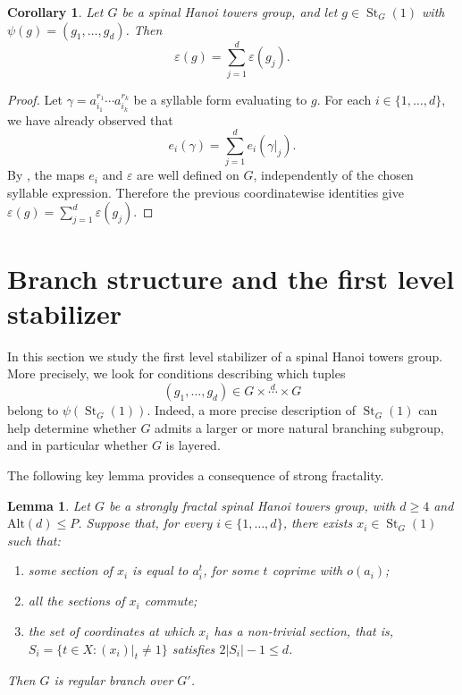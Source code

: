 \documentclass[11pt,leqno]{amsart}
\theoremstyle{plain}
\newtheorem{corollary}[corollary]{Corollary}
\newtheorem{lemma}[lemma]{Lemma}
\DeclareMathOperator{\St}{St}
\newcommand{\alt}{\mathrm{Alt}}
\newcommand{\fc}[1]{\textcolor{teal}{#1}}
\numberwithin{equation}{section}
\begin{document}
\begin{corollary}\label{cor:epsilon-sections}
Let $G$ be a spinal Hanoi towers group, and let $g\in \St_G(1)$ with $\psi(g)=(g_1,\ldots,g_d)$.
Then
\[
\varepsilon(g)=\sum_{j=1}^d \varepsilon(g_j).
\]
\end{corollary}

\begin{proof}
Let $\gamma=a_{i_1}^{r_1}\cdots a_{i_k}^{r_k}$ be a syllable form evaluating to $g$. For each $i\in\{1,\ldots,d\}$, we have
already observed that
\[
e_i(\gamma)=\sum_{j=1}^d e_i(\gamma|_j).
\]
By , the maps $e_i$ and $\varepsilon$ are well defined on $G$, independently of the chosen syllable expression. Therefore the previous coordinatewise identities give $\varepsilon(g)=\sum_{j=1}^d \varepsilon(g_j)$.
\end{proof}



\section{Branch structure and the first level stabilizer}
\label{sectbranch}

In this section we study the first level stabilizer of a spinal Hanoi towers group. More precisely, we look for conditions describing which tuples
\[
(g_1,\ldots,g_d)\in G\times \stackrel{d}{\cdots}\times G
\]
belong to $\psi(\St_G(1))$.
Indeed, a more precise description of $\St_G(1)$ can help determine whether $G$ admits a larger or more natural branching subgroup, and in particular whether $G$ is layered.

The following key lemma provides a  consequence of strong fractality.

\begin{lemma}\label{strongfractimpliesbranch}
	Let $G$ be a strongly fractal spinal Hanoi towers group, with $d\geq 4$ and
	$\alt(d)\leq P$. Suppose that, for every $i\in\{1,\ldots,d\}$, there exists $x_i\in\St_G(1)$ such that:
	\begin{enumerate}
		\item some section of $x_i$ is equal to %
        $a_{i}^{t}$, for some $t$ coprime with $o(a_{i})$;
        \item all the sections of $x_{i}$ commute;
		\item the set of coordinates at which $x_i$ has a non-trivial
		section, that is,\\  $S_i=\{t\in X:(x_i)|_t\neq 1\}$ satisfies  $2|S_i|-1\leq d$.
	\end{enumerate}
	Then $G$ is regular branch over $G'$.
\end{lemma}
\end{document}
